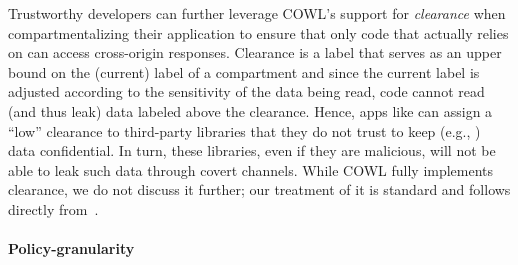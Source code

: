 Trustworthy developers can further leverage COWL's support for
\emph{clearance} when compartmentalizing their application to ensure
that only code that actually relies on \lcors{} can access
cross-origin responses.
%
Clearance is a label that serves as an upper bound on the (current)
label of a compartment and since the current label is adjusted
according to the sensitivity of the data being read, code cannot read
(and thus leak) data labeled above the clearance.
%
Hence, apps like  can assign a ``low'' clearance to
third-party libraries that they do not trust to keep (e.g.,
) data confidential.
%
In turn, these libraries, even if they are malicious, will not be able
to leak such data through covert channels.
%
While COWL fully implements clearance, we do not discuss it further;
our treatment of it is standard and follows directly
from~\cite{efstathopoulos:asbestos, Zeldovich:2006,
stefan:2011:flexible, Breeze13}.


%



\paragraph{Policy-granularity}

